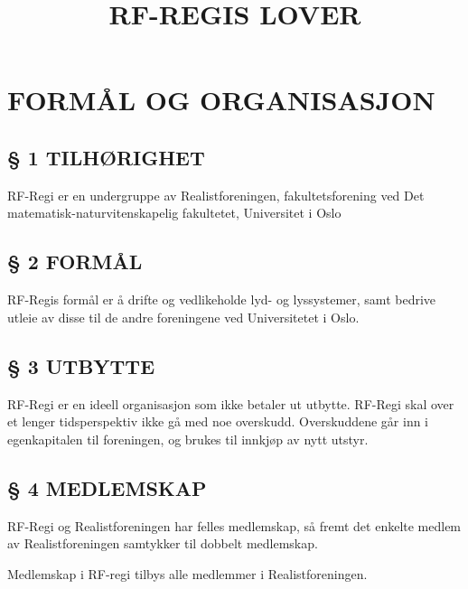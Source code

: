 \documentclass[a4paper,11pt,norsk]{scrartcl}
\title{\phantomsection%
  RF-REGIS LOVER%
  \label{rf-regis-lover}%
  \\ %
  \DUdocumentsubtitle{Vedtatt 18. April 2018}%
  \label{vedtatt-18-april-2018}}
\author{}
\date{}
\providecommand*{\DUtransition}{%
  \hspace*{\fill}\hrulefill\hspace*{\fill}
  \vskip 0.5\baselineskip
}
\begin{document}
\maketitle

\label{contents}
\tableofcontents

\DUtransition


\section{FORMÅL OG ORGANISASJON%
  \label{formal-og-organisasjon}%
}


\subsection{§ 1 TILHØRIGHET%
  \label{tilhorighet}%
}

RF-Regi er en undergruppe av Realistforeningen, fakultetsforening ved Det matematisk-naturvitenskapelig fakultetet, Universitet i Oslo


\subsection{§ 2 FORMÅL%
  \label{formal}%
}

RF-Regis formål er å drifte og vedlikeholde lyd- og lyssystemer, samt
bedrive utleie av disse til de andre foreningene ved Universitetet i Oslo.


\subsection{§ 3 UTBYTTE%
  \label{utbytte}%
}

RF-Regi er en ideell organisasjon som ikke betaler ut utbytte.
RF-Regi skal over et lenger tidsperspektiv ikke gå med noe overskudd.
Overskuddene går inn i egenkapitalen til foreningen, og brukes
til innkjøp av nytt utstyr.


\subsection{§ 4 MEDLEMSKAP%
  \label{medlemskap}%
}

RF-Regi og Realistforeningen har felles medlemskap, så fremt det enkelte medlem av Realistforeningen samtykker til dobbelt medlemskap.

Medlemskap i RF-regi tilbys alle medlemmer i Realistforeningen.
\end{document}
